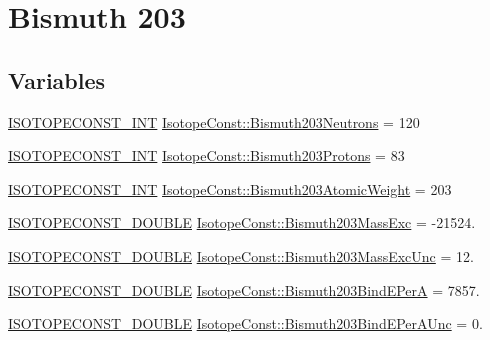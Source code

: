 \hypertarget{group___isotope_const-_bismuth-_bi203}{}\section{Bismuth 203}
\label{group___isotope_const-_bismuth-_bi203}
\subsection*{Variables}
\begin{DoxyCompactItemize}
\item 
\mbox{\hyperlink{group___isotope_const-_macros_ga5f18360b3e99483a35c32d789e62621c}{I\+S\+O\+T\+O\+P\+E\+C\+O\+N\+S\+T\+\_\+\+I\+NT}} \mbox{\hyperlink{group___isotope_const-_bismuth-_bi203_ga33b848f0c4f55474ddce16cad1401cdc}{Isotope\+Const\+::\+Bismuth203\+Neutrons}} = 120
\item 
\mbox{\hyperlink{group___isotope_const-_macros_ga5f18360b3e99483a35c32d789e62621c}{I\+S\+O\+T\+O\+P\+E\+C\+O\+N\+S\+T\+\_\+\+I\+NT}} \mbox{\hyperlink{group___isotope_const-_bismuth-_bi203_ga3221d271a5dee20424902a9cf239272d}{Isotope\+Const\+::\+Bismuth203\+Protons}} = 83
\item 
\mbox{\hyperlink{group___isotope_const-_macros_ga5f18360b3e99483a35c32d789e62621c}{I\+S\+O\+T\+O\+P\+E\+C\+O\+N\+S\+T\+\_\+\+I\+NT}} \mbox{\hyperlink{group___isotope_const-_bismuth-_bi203_ga12326688b201255b93b67334c9b969a6}{Isotope\+Const\+::\+Bismuth203\+Atomic\+Weight}} = 203
\item 
\mbox{\hyperlink{group___isotope_const-_macros_ga8f45a7272ce02c0b4c65c44636ed719a}{I\+S\+O\+T\+O\+P\+E\+C\+O\+N\+S\+T\+\_\+\+D\+O\+U\+B\+LE}} \mbox{\hyperlink{group___isotope_const-_bismuth-_bi203_ga11bcc02838b1a3f4211ad0ad01caa61e}{Isotope\+Const\+::\+Bismuth203\+Mass\+Exc}} = -\/21524.
\item 
\mbox{\hyperlink{group___isotope_const-_macros_ga8f45a7272ce02c0b4c65c44636ed719a}{I\+S\+O\+T\+O\+P\+E\+C\+O\+N\+S\+T\+\_\+\+D\+O\+U\+B\+LE}} \mbox{\hyperlink{group___isotope_const-_bismuth-_bi203_ga5811a1cc4444c0cdc7d4e6dc6522ed11}{Isotope\+Const\+::\+Bismuth203\+Mass\+Exc\+Unc}} = 12.
\item 
\mbox{\hyperlink{group___isotope_const-_macros_ga8f45a7272ce02c0b4c65c44636ed719a}{I\+S\+O\+T\+O\+P\+E\+C\+O\+N\+S\+T\+\_\+\+D\+O\+U\+B\+LE}} \mbox{\hyperlink{group___isotope_const-_bismuth-_bi203_ga4c4bad5a4a26cbe543077680e9b9443c}{Isotope\+Const\+::\+Bismuth203\+Bind\+E\+PerA}} = 7857.
\item 
\mbox{\hyperlink{group___isotope_const-_macros_ga8f45a7272ce02c0b4c65c44636ed719a}{I\+S\+O\+T\+O\+P\+E\+C\+O\+N\+S\+T\+\_\+\+D\+O\+U\+B\+LE}} \mbox{\hyperlink{group___isotope_const-_bismuth-_bi203_gab907beec8525c7a2049be4fbb7d615ee}{Isotope\+Const\+::\+Bismuth203\+Bind\+E\+Per\+A\+Unc}} = 0.

\end{DoxyCompactItemize}
